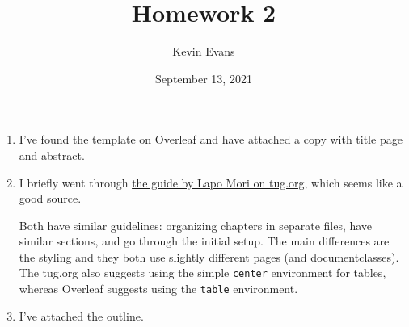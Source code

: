 \documentclass{homework}
\title{Homework 2}
\author{Kevin Evans}
\date{September 13, 2021}
\begin{document}
	\maketitle
	\begin{enumerate}
		\item I've found the \href{https://www.overleaf.com/latex/templates/wsu-dissertation-thesis-latex-template/fgzqxkvxnsqy}{template on Overleaf} and have attached a copy with title page and abstract.
		
			
		\item I briefly went through \href{https://tug.org/pracjourn/2008-1/mori/mori.pdf}{the guide by Lapo Mori on tug.org}, which seems like a good source.
		
		Both have similar guidelines: organizing chapters in separate files, have similar sections, and go through the initial setup. The main differences are the styling and they both use slightly different pages (and documentclasses). The tug.org also suggests using the simple \texttt{center} environment for tables, whereas Overleaf suggests using the \texttt{table} environment.
				
		\item I've attached the outline.
	\end{enumerate}
\end{document}
